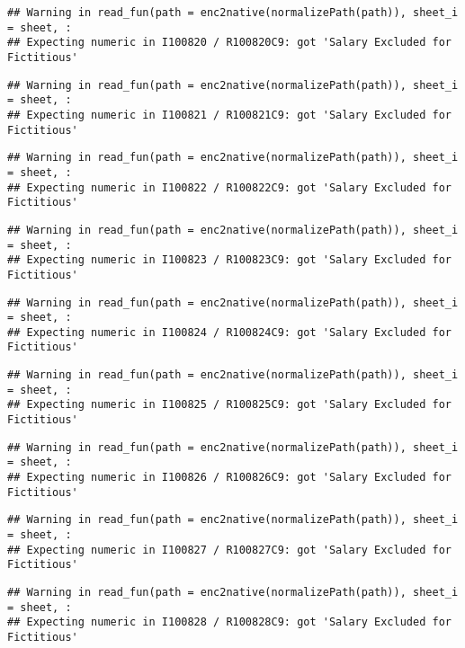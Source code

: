 \documentclass[
]{article}
\begin{document}
\begin{verbatim}
## Warning in read_fun(path = enc2native(normalizePath(path)), sheet_i = sheet, :
## Expecting numeric in I100820 / R100820C9: got 'Salary Excluded for Fictitious'
\end{verbatim}

\begin{verbatim}
## Warning in read_fun(path = enc2native(normalizePath(path)), sheet_i = sheet, :
## Expecting numeric in I100821 / R100821C9: got 'Salary Excluded for Fictitious'
\end{verbatim}

\begin{verbatim}
## Warning in read_fun(path = enc2native(normalizePath(path)), sheet_i = sheet, :
## Expecting numeric in I100822 / R100822C9: got 'Salary Excluded for Fictitious'
\end{verbatim}

\begin{verbatim}
## Warning in read_fun(path = enc2native(normalizePath(path)), sheet_i = sheet, :
## Expecting numeric in I100823 / R100823C9: got 'Salary Excluded for Fictitious'
\end{verbatim}

\begin{verbatim}
## Warning in read_fun(path = enc2native(normalizePath(path)), sheet_i = sheet, :
## Expecting numeric in I100824 / R100824C9: got 'Salary Excluded for Fictitious'
\end{verbatim}

\begin{verbatim}
## Warning in read_fun(path = enc2native(normalizePath(path)), sheet_i = sheet, :
## Expecting numeric in I100825 / R100825C9: got 'Salary Excluded for Fictitious'
\end{verbatim}

\begin{verbatim}
## Warning in read_fun(path = enc2native(normalizePath(path)), sheet_i = sheet, :
## Expecting numeric in I100826 / R100826C9: got 'Salary Excluded for Fictitious'
\end{verbatim}

\begin{verbatim}
## Warning in read_fun(path = enc2native(normalizePath(path)), sheet_i = sheet, :
## Expecting numeric in I100827 / R100827C9: got 'Salary Excluded for Fictitious'
\end{verbatim}

\begin{verbatim}
## Warning in read_fun(path = enc2native(normalizePath(path)), sheet_i = sheet, :
## Expecting numeric in I100828 / R100828C9: got 'Salary Excluded for Fictitious'
\end{verbatim}
\end{document}
